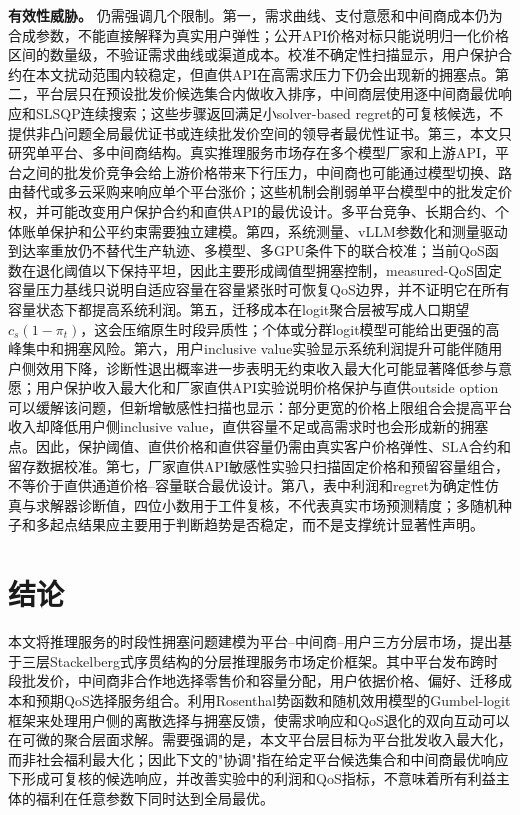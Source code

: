 \documentclass[UTF8,11pt]{ctexart}
\begin{document}
\textbf{有效性威胁。} 仍需强调几个限制。第一，需求曲线、支付意愿和中间商成本仍为合成参数，不能直接解释为真实用户弹性；公开API价格对标只能说明归一化价格区间的数量级，不验证需求曲线或渠道成本。校准不确定性扫描显示，用户保护合约在本文扰动范围内较稳定，但直供API在高需求压力下仍会出现新的拥塞点。第二，平台层只在预设批发价候选集合内做收入排序，中间商层使用逐中间商最优响应和SLSQP连续搜索；这些步骤返回满足小solver-based regret的可复核候选，不提供非凸问题全局最优证书或连续批发价空间的领导者最优性证书。第三，本文只研究单平台、多中间商结构。真实推理服务市场存在多个模型厂家和上游API，平台之间的批发价竞争会给上游价格带来下行压力，中间商也可能通过模型切换、路由替代或多云采购来响应单个平台涨价；这些机制会削弱单平台模型中的批发定价权，并可能改变用户保护合约和直供API的最优设计。多平台竞争、长期合约、个体账单保护和公平约束需要独立建模。第四，系统测量、vLLM参数化和测量驱动到达率重放仍不替代生产轨迹、多模型、多GPU条件下的联合校准；当前QoS函数在退化阈值以下保持平坦，因此主要形成阈值型拥塞控制，measured-QoS固定容量压力基线只说明自适应容量在容量紧张时可恢复QoS边界，并不证明它在所有容量状态下都提高系统利润。第五，迁移成本在logit聚合层被写成人口期望$c_s(1-\pi_t)$，这会压缩原生时段异质性；个体或分群logit模型可能给出更强的高峰集中和拥塞风险。第六，用户inclusive value实验显示系统利润提升可能伴随用户侧效用下降，诊断性退出概率进一步表明无约束收入最大化可能显著降低参与意愿；用户保护收入最大化和厂家直供API实验说明价格保护与直供outside option可以缓解该问题，但新增敏感性扫描也显示：部分更宽的价格上限组合会提高平台收入却降低用户侧inclusive value，直供容量不足或高需求时也会形成新的拥塞点。因此，保护阈值、直供价格和直供容量仍需由真实客户价格弹性、SLA合约和留存数据校准。第七，厂家直供API敏感性实验只扫描固定价格和预留容量组合，不等价于直供通道价格--容量联合最优设计。第八，表中利润和regret为确定性仿真与求解器诊断值，四位小数用于工件复核，不代表真实市场预测精度；多随机种子和多起点结果应主要用于判断趋势是否稳定，而不是支撑统计显著性声明。

\section{结论}
\label{sec:conclusion}

本文将推理服务的时段性拥塞问题建模为平台--中间商--用户三方分层市场，提出基于三层Stackelberg式序贯结构的分层推理服务市场定价框架。其中平台发布跨时段批发价，中间商非合作地选择零售价和容量分配，用户依据价格、偏好、迁移成本和预期QoS选择服务组合。利用Rosenthal势函数和随机效用模型的Gumbel-logit框架来处理用户侧的离散选择与拥塞反馈，使需求响应和QoS退化的双向互动可以在可微的聚合层面求解。需要强调的是，本文平台层目标为平台批发收入最大化，而非社会福利最大化；因此下文的"协调"指在给定平台候选集合和中间商最优响应下形成可复核的候选响应，并改善实验中的利润和QoS指标，不意味着所有利益主体的福利在任意参数下同时达到全局最优。
\end{document}
